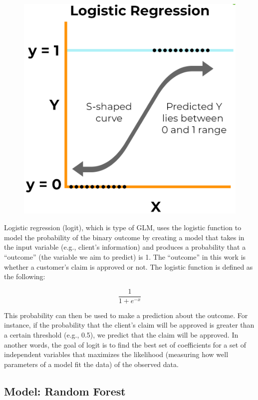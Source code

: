 \documentclass{article}
\begin{document}
\begin{figure}
\includegraphics[width=0.9\linewidth]{./figures/logit-model.png}
\end{figure}

Logistic regression (logit), which is type of GLM, uses the logistic
function to model the probability of the binary outcome by creating a
model that takes in the input variable (e.g., client's information) and
produces a probability that a ``outcome'' (the variable we aim to
predict) is 1. The ``outcome'' in this work is whether a customer's
claim is approved or not. The logistic function is defined as the
following:

\[\frac{1}{1 + e^{-x}}\]

This probability can then be used to make a prediction about the
outcome. For instance, if the probability that the client's claim will
be approved is greater than a certain threshold (e.g., 0.5), we predict
that the claim will be approved. In another words, the goal of logit is
to find the best set of coefficients for a set of independent variables
that maximizes the likelihood (measuring how well parameters of a model
fit the data) of the observed data.

\hypertarget{model-random-forest}{%
\subsection{\texorpdfstring{Model: Random Forest
\label{subsec:model-rf}}{Model: Random Forest }}\label{model-random-forest}}
\end{document}
